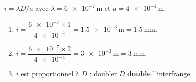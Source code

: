 \documentclass[11pt,a4paper]{article}
\begin{document}
\begin{corrige}
$i=\lambda D/a$ avec $\lambda=\num{6e-7}\,\si{\metre}$ et $a=\num{4e-4}\,\si{\metre}$.
\begin{enumerate}[label=\alph*)]
  \item $i=\dfrac{\num{6e-7}\times 1}{\num{4e-4}}=\num{1.5e-3}\,\si{\metre}=\SI{1.5}{\milli\metre}.$
  \item $i=\dfrac{\num{6e-7}\times 2}{\num{4e-4}}=\num{3e-3}\,\si{\metre}=\SI{3}{\milli\metre}.$
  \item $i$ est proportionnel à $D$ : doubler $D$ \textbf{double} l'interfrange.
\end{enumerate}
\end{corrige}
\end{document}
